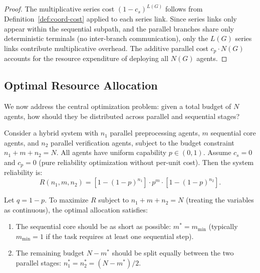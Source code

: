 \begin{proof}
The multiplicative series cost $(1-c_s)^{L(G)}$ follows from
Definition~\ref{def:coord-cost} applied to each series link.  Since series links
only appear within the sequential subpath, and the parallel branches share only
deterministic terminals (no inter-branch communication), only the $L(G)$ series
links contribute multiplicative overhead.  The additive parallel cost $c_p \cdot N(G)$
accounts for the resource expenditure of deploying all $N(G)$ agents.
\end{proof}

\subsection{Optimal Resource Allocation}

We now address the central optimization problem: given a total budget of $N$ agents,
how should they be distributed across parallel and sequential stages?

\begin{theorem}
\label{thm:r4-optimal-allocation}
Consider a hybrid system with $n_1$ parallel preprocessing agents, $m$ sequential
core agents, and $n_2$ parallel verification agents, subject to the budget
constraint $n_1 + m + n_2 = N$.  All agents have uniform capability $p \in (0,1)$.
Assume $c_s = 0$ and $c_p = 0$ (pure reliability optimization without per-unit cost).
Then the system reliability is:
\[
  R(n_1, m, n_2) = [1 - (1-p)^{n_1}] \cdot p^m \cdot [1 - (1-p)^{n_2}].
\]

Let $q = 1 - p$.  To maximize $R$ subject to $n_1 + m + n_2 = N$ (treating the
variables as continuous), the optimal allocation satisfies:
\begin{enumerate}
  \item The sequential core should be as short as possible: $m^* = m_{\min}$
    (typically $m_{\min} = 1$ if the task requires at least one sequential step).
  \item The remaining budget $N - m^*$ should be split equally between the two
    parallel stages: $n_1^* = n_2^* = (N - m^*)/2$.
\end{enumerate}
\end{theorem}

